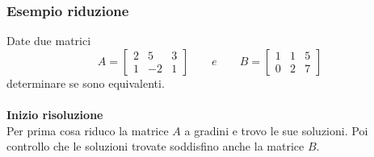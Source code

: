 \documentclass[italian]{article}
\begin{document}
\subsubsection{Esempio riduzione}
Date due matrici
\[
	A = 
	\begin{bmatrix}
	2 & 5 & 3 \\
	1 & -2 & 1	
	\end{bmatrix}
	\qquad e \qquad
	B =
	\begin{bmatrix}
		1 & 1 & 5 \\
		0 & 2 & 7	
	\end{bmatrix}
\]
determinare se sono equivalenti.\\\\
\textbf{Inizio risoluzione}\\[1mm]
Per prima cosa riduco la matrice $A$ a gradini e trovo le sue soluzioni. Poi controllo che le soluzioni trovate soddisfino anche la matrice $B$.
\end{document}
